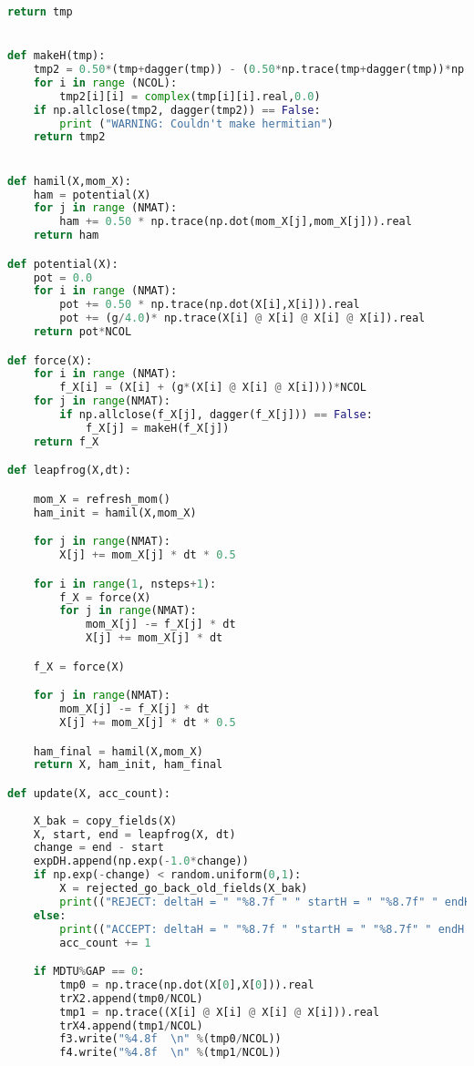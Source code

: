 \begin{lstlisting}[language=Python]
    return tmp


def makeH(tmp):
    tmp2 = 0.50*(tmp+dagger(tmp)) - (0.50*np.trace(tmp+dagger(tmp))*np.eye(NCOL))/NCOL
    for i in range (NCOL):
        tmp2[i][i] = complex(tmp[i][i].real,0.0)  
    if np.allclose(tmp2, dagger(tmp2)) == False:
        print ("WARNING: Couldn't make hermitian")
    return tmp2


def hamil(X,mom_X):
    ham = potential(X) 
    for j in range (NMAT):
        ham += 0.50 * np.trace(np.dot(mom_X[j],mom_X[j])).real 
    return ham  

def potential(X):
    pot = 0.0 
    for i in range (NMAT):
        pot += 0.50 * np.trace(np.dot(X[i],X[i])).real   
        pot += (g/4.0)* np.trace(X[i] @ X[i] @ X[i] @ X[i]).real
    return pot*NCOL

def force(X): 
    for i in range (NMAT): 
        f_X[i] = (X[i] + (g*(X[i] @ X[i] @ X[i])))*NCOL
    for j in range(NMAT):
        if np.allclose(f_X[j], dagger(f_X[j])) == False:
            f_X[j] = makeH(f_X[j])
    return f_X

def leapfrog(X,dt):

    mom_X = refresh_mom()
    ham_init = hamil(X,mom_X)

    for j in range(NMAT):
        X[j] += mom_X[j] * dt * 0.5 

    for i in range(1, nsteps+1):
        f_X = force(X)
        for j in range(NMAT):
            mom_X[j] -= f_X[j] * dt
            X[j] += mom_X[j] * dt

    f_X = force(X)

    for j in range(NMAT):
        mom_X[j] -= f_X[j] * dt
        X[j] += mom_X[j] * dt * 0.5 

    ham_final = hamil(X,mom_X)
    return X, ham_init, ham_final

def update(X, acc_count):
    
    X_bak = copy_fields(X) 
    X, start, end = leapfrog(X, dt) 
    change = end - start  
    expDH.append(np.exp(-1.0*change)) 
    if np.exp(-change) < random.uniform(0,1):
        X = rejected_go_back_old_fields(X_bak)
        print(("REJECT: deltaH = " "%8.7f " " startH = " "%8.7f" " endH = " "%8.7f" % (change, start, end)))
    else:   
        print(("ACCEPT: deltaH = " "%8.7f " "startH = " "%8.7f" " endH = " "%8.7f" % (change, start, end)))
        acc_count += 1 

    if MDTU%GAP == 0:
        tmp0 = np.trace(np.dot(X[0],X[0])).real
        trX2.append(tmp0/NCOL)
        tmp1 = np.trace((X[i] @ X[i] @ X[i] @ X[i])).real
        trX4.append(tmp1/NCOL)
        f3.write("%4.8f  \n" %(tmp0/NCOL))
        f4.write("%4.8f  \n" %(tmp1/NCOL))
    

\end{lstlisting}
